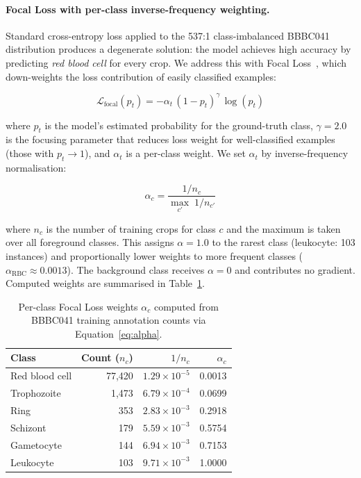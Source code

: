 \documentclass[review,12pt]{elsarticle}
\begin{document}
\paragraph{Focal Loss with per-class inverse-frequency weighting.}
Standard cross-entropy loss applied to the 537:1 class-imbalanced BBBC041
distribution produces a degenerate solution: the model achieves high
accuracy by predicting \textit{red blood cell} for every crop. We address
this with Focal Loss~\cite{lin2017focal}, which down-weights the loss
contribution of easily classified examples:

\begin{equation}
  \mathcal{L}_{\text{focal}}(p_t) =
  -\alpha_t \,(1-p_t)^{\gamma}\,\log(p_t)
  \label{eq:focal}
\end{equation}

where $p_t$ is the model's estimated probability for the ground-truth class,
$\gamma = 2.0$ is the focusing parameter that reduces loss weight for
well-classified examples (those with $p_t \to 1$), and $\alpha_t$ is a
per-class weight. We set $\alpha_t$ by inverse-frequency normalisation:

\begin{equation}
  \alpha_c = \frac{1/n_c}{\max_{c'} \; 1/n_{c'}}
  \label{eq:alpha}
\end{equation}

where $n_c$ is the number of training crops for class $c$ and the maximum
is taken over all foreground classes. This assigns $\alpha = 1.0$ to the
rarest class (leukocyte: 103 instances) and proportionally lower weights
to more frequent classes ($\alpha_{\text{RBC}} \approx 0.0013$). The
background class receives $\alpha = 0$ and contributes no gradient.
Computed weights are summarised in Table~\ref{tab:focal_weights}.

\begin{table}[H]
\centering
\small
\caption{Per-class Focal Loss weights $\alpha_c$ computed from BBBC041
  training annotation counts via Equation~\ref{eq:alpha}.}
\label{tab:focal_weights}
\renewcommand{\arraystretch}{1.15}
\begin{tabular}{lrrr}
\toprule
\textbf{Class} & \textbf{Count} ($n_c$) & \textbf{$1/n_c$} & $\alpha_c$ \\
\midrule
Red blood cell  & 77,420 & $1.29 \times 10^{-5}$ & 0.0013 \\
Trophozoite     &  1,473 & $6.79 \times 10^{-4}$ & 0.0699 \\
Ring            &    353 & $2.83 \times 10^{-3}$ & 0.2918 \\
Schizont        &    179 & $5.59 \times 10^{-3}$ & 0.5754 \\
Gametocyte      &    144 & $6.94 \times 10^{-3}$ & 0.7153 \\
Leukocyte       &    103 & $9.71 \times 10^{-3}$ & 1.0000 \\
\bottomrule
\end{tabular}
\end{table}
\end{document}
